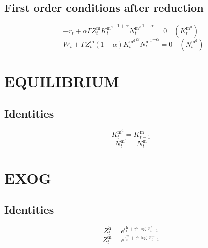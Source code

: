 \subsection{First order conditions after reduction}

\begin{equation}
-r_{t} + {\alpha} {\Gamma} {Z^{\mathrm{m}}_{t}} {{K^{\mathrm{m}^{\mathrm{d}}}_{t}}^{-1 + \alpha}} {{N^{\mathrm{m}^{\mathrm{d}}}_{t}}^{1 - \alpha}} = 0
 \quad \left(K^{\mathrm{m}^{\mathrm{d}}}_{t}\right)
\end{equation}
\begin{equation}
-W_{t} + {\Gamma} {Z^{\mathrm{m}}_{t}} \left(1 - \alpha\right) {{K^{\mathrm{m}^{\mathrm{d}}}_{t}}^{\alpha}} {{N^{\mathrm{m}^{\mathrm{d}}}_{t}}^{-\alpha}} = 0
 \quad \left(N^{\mathrm{m}^{\mathrm{d}}}_{t}\right)
\end{equation}




\section{EQUILIBRIUM}

\subsection{Identities}

\begin{equation}
K^{\mathrm{m}^{\mathrm{d}}}_{t} = K^{\mathrm{m}}_{t-1}
\end{equation}
\begin{equation}
N^{\mathrm{m}^{\mathrm{d}}}_{t} = N^{\mathrm{m}}_{t}
\end{equation}




\section{EXOG}

\subsection{Identities}

\begin{equation}
Z^{\mathrm{h}}_{t} = e^{\epsilon^{\mathrm{h}}_{t} + {\psi} {\log{Z^{\mathrm{h}}_{t-1}}}}
\end{equation}
\begin{equation}
Z^{\mathrm{m}}_{t} = e^{\epsilon^{\mathrm{m}}_{t} + {\phi} {\log{Z^{\mathrm{m}}_{t-1}}}}
\end{equation}




